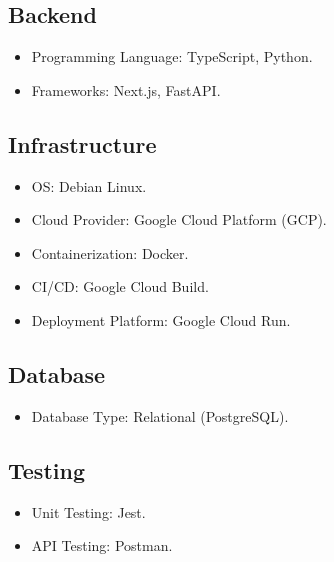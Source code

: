 \subsection{Backend}
\begin{itemize}
    \item Programming Language: TypeScript, Python.
    \item Frameworks: Next.js, FastAPI.
\end{itemize}

\subsection{Infrastructure}
\begin{itemize}
    \item OS: Debian Linux.
    \item Cloud Provider: Google Cloud Platform (GCP).
    \item Containerization: Docker.
    \item CI/CD: Google Cloud Build.
    \item Deployment Platform: Google Cloud Run.
\end{itemize}

\subsection{Database}
\begin{itemize}
    \item Database Type: Relational (PostgreSQL).
\end{itemize}

\subsection{Testing}
\begin{itemize}
    \item Unit Testing: Jest.
    \item API Testing: Postman.
\end{itemize}

